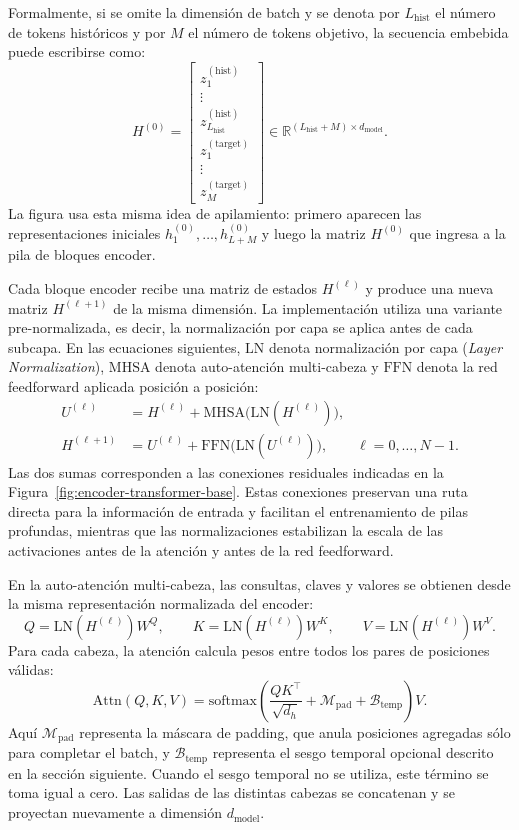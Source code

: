 Formalmente, si se omite la dimensión de batch y se denota por $L_{\text{hist}}$ el número de tokens históricos y por $M$ el número de tokens objetivo, la secuencia embebida puede escribirse como:
\[
    H^{(0)}
    =
    \begin{bmatrix}
        z^{(\text{hist})}_1 \\
        \vdots \\
        z^{(\text{hist})}_{L_{\text{hist}}} \\
        z^{(\text{target})}_1 \\
        \vdots \\
        z^{(\text{target})}_{M}
    \end{bmatrix}
    \in \mathbb{R}^{(L_{\text{hist}}+M)\times d_{\text{model}}}.
\]
La figura usa esta misma idea de apilamiento: primero aparecen las representaciones iniciales $h^{(0)}_1,\dots,h^{(0)}_{L+M}$ y luego la matriz $H^{(0)}$ que ingresa a la pila de bloques encoder.

Cada bloque encoder recibe una matriz de estados $H^{(\ell)}$ y produce una nueva matriz $H^{(\ell+1)}$ de la misma dimensión. La implementación utiliza una variante pre-normalizada, es decir, la normalización por capa se aplica antes de cada subcapa. En las ecuaciones siguientes, $\mathrm{LN}$ denota normalización por capa (\emph{Layer Normalization}), $\mathrm{MHSA}$ denota auto-atención multi-cabeza y $\mathrm{FFN}$ denota la red feedforward aplicada posición a posición:
\begin{align}
    U^{(\ell)}
    &=
    H^{(\ell)}
    +
    \mathrm{MHSA}
    \bigl(\mathrm{LN}(H^{(\ell)})\bigr),
    \\
    H^{(\ell+1)}
    &=
    U^{(\ell)}
    +
    \mathrm{FFN}
    \bigl(\mathrm{LN}(U^{(\ell)})\bigr),
    \qquad
    \ell=0,\dots,N-1.
\end{align}
Las dos sumas corresponden a las conexiones residuales indicadas en la Figura~\ref{fig:encoder-transformer-base}. Estas conexiones preservan una ruta directa para la información de entrada y facilitan el entrenamiento de pilas profundas, mientras que las normalizaciones estabilizan la escala de las activaciones antes de la atención y antes de la red feedforward.

En la auto-atención multi-cabeza, las consultas, claves y valores se obtienen desde la misma representación normalizada del encoder:
\[
    Q = \mathrm{LN}(H^{(\ell)})W^Q,\qquad
    K = \mathrm{LN}(H^{(\ell)})W^K,\qquad
    V = \mathrm{LN}(H^{(\ell)})W^V.
\]
Para cada cabeza, la atención calcula pesos entre todos los pares de posiciones válidas:
\[
    \mathrm{Attn}(Q,K,V)
    =
    \mathrm{softmax}
    \left(
        \frac{QK^\top}{\sqrt{d_h}} + \mathcal{M}_{\text{pad}} + \mathcal{B}_{\text{temp}}
    \right)V.
\]
Aquí $\mathcal{M}_{\text{pad}}$ representa la máscara de padding, que anula posiciones agregadas sólo para completar el batch, y $\mathcal{B}_{\text{temp}}$ representa el sesgo temporal opcional descrito en la sección siguiente. Cuando el sesgo temporal no se utiliza, este término se toma igual a cero. Las salidas de las distintas cabezas se concatenan y se proyectan nuevamente a dimensión $d_{\text{model}}$.

